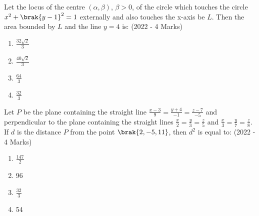  \item{
    	
	    	Let the locus of the centre $(\alpha, \beta)$, $\beta > 0$, of the circle which touches the circle $x^2 + \brak{y - 1}^2 = 1$ externally and also touches the x-axis be $L$. Then the area bounded by $L$ and the line $y = 4$ is:
	    	\text{   }\hfill
	    	{(2022 - 4 Marks)}
	    	\begin{multicols}{4}
	    		\begin{enumerate}
	    			\item $\frac{32\sqrt{2}}{3}$
	    			\item $\frac{40\sqrt{2}}{3}$
	    			\item $\frac{64}{3}$
	    			\item $\frac{32}{3}$
	    		\end{enumerate}
	    	\end{multicols}
	    	
	    }
    \item{
	
		    Let $P$ be the plane containing the straight line $\frac{x-3}{9}=\frac{y+4}{-1}=\frac{z-7}{-5}$ and perpendicular to the plane containing the straight lines $\frac{x}{2}=\frac{y}{3}=\frac{z}{5}$ and $\frac{x}{3}=\frac{y}{7}=\frac{z}{8}.$ If $d$ is the distance $P$ from the point $\brak{2, -5, 11}$, then $d^2$ is equal to:
			\text{   }\hfill
			{(2022 - 4 Marks)}
			\begin{multicols}{4}
				\begin{enumerate}
						\item $\frac{147}{2}$
						\item 96
						\item $\frac{32}{3}$
						\item 54
				\end{enumerate}
			\end{multicols}
			
		}

